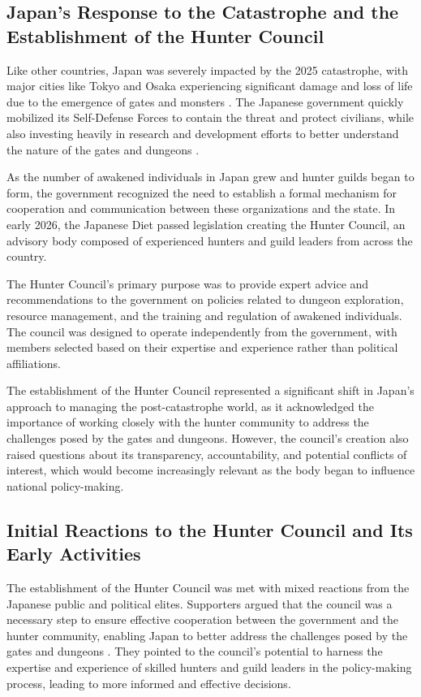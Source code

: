 \documentclass[12pt, a4paper]{article}
\begin{document}
\subsection{Japan's Response to the Catastrophe and the Establishment of the Hunter Council}

Like other countries, Japan was severely impacted by the 2025 catastrophe, with major cities like Tokyo and Osaka experiencing significant damage and loss of life due to the emergence of gates and monsters \citep{nakamura2026shinto}. The Japanese government quickly mobilized its Self-Defense Forces to contain the threat and protect civilians, while also investing heavily in research and development efforts to better understand the nature of the gates and dungeons \citep{sakamoto2026emergence}.

As the number of awakened individuals in Japan grew and hunter guilds began to form, the government recognized the need to establish a formal mechanism for cooperation and communication between these organizations and the state. In early 2026, the Japanese Diet passed legislation creating the Hunter Council, an advisory body composed of experienced hunters and guild leaders from across the country.

The Hunter Council's primary purpose was to provide expert advice and recommendations to the government on policies related to dungeon exploration, resource management, and the training and regulation of awakened individuals. The council was designed to operate independently from the government, with members selected based on their expertise and experience rather than political affiliations.

The establishment of the Hunter Council represented a significant shift in Japan's approach to managing the post-catastrophe world, as it acknowledged the importance of working closely with the hunter community to address the challenges posed by the gates and dungeons. However, the council's creation also raised questions about its transparency, accountability, and potential conflicts of interest, which would become increasingly relevant as the body began to influence national policy-making.

\subsection{Initial Reactions to the Hunter Council and Its Early Activities}

The establishment of the Hunter Council was met with mixed reactions from the Japanese public and political elites. Supporters argued that the council was a necessary step to ensure effective cooperation between the government and the hunter community, enabling Japan to better address the challenges posed by the gates and dungeons \citep{ishikawa2026rise}. They pointed to the council's potential to harness the expertise and experience of skilled hunters and guild leaders in the policy-making process, leading to more informed and effective decisions.
\end{document}
